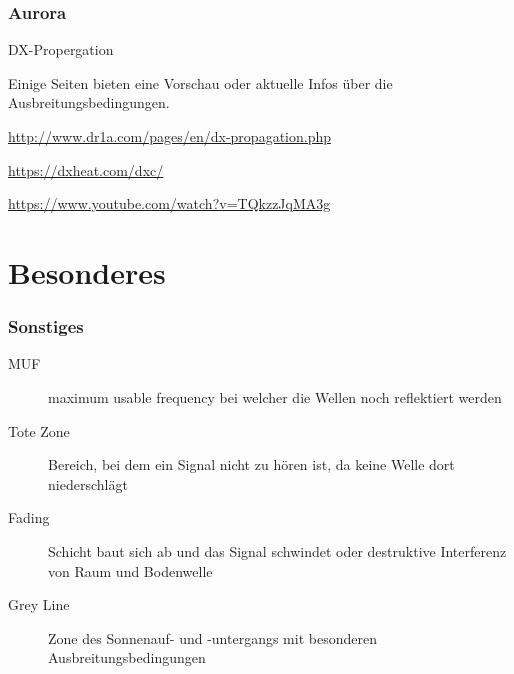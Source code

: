 \begin{frame}
    \frametitle{Aurora}
	\begin{center}
        \begin{block}{DX-Propergation}
        \item Einige Seiten bieten eine Vorschau oder aktuelle Infos über die Ausbreitungsbedingungen.
        \item \url{http://www.dr1a.com/pages/en/dx-propagation.php}
        \item \url{https://dxheat.com/dxc/}
        \item \url{https://www.youtube.com/watch?v=TQkzzJqMA3g}
        \end{block}
    \end{center}
\end{frame}

\section*{Besonderes}

\begin{frame}
    \frametitle{Sonstiges}
    \begin{description}
      \item[MUF] maximum usable frequency bei welcher die Wellen noch reflektiert werden
      \item[Tote Zone] Bereich, bei dem ein Signal nicht zu hören ist, da keine Welle dort niederschlägt
      \item[Fading] Schicht baut sich ab und das Signal schwindet oder destruktive Interferenz von Raum und Bodenwelle
      \item[Grey Line] Zone des Sonnenauf- und -untergangs mit besonderen Ausbreitungsbedingungen
    \end{description}
\end{frame}

